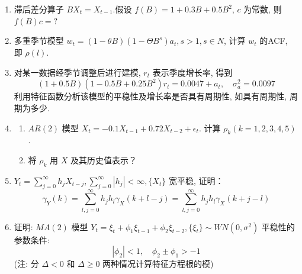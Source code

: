\begin{enumerate}
    
    \item 滞后差分算子 $B X_{t}=X_{t-1}$.假设 $f(B)=1+0.3B+0.5B^{2}$, $c$ 为常数, 则 $f(B)c=?$
    
    \item 多重季节模型 $w_{t}=(1-\theta B)(1-\Theta B^{s})a_{t}, s>1, s\in N$, 计算 $w_{t}$ 的ACF, 即 $\rho(l)$.
    
    \item 对某一数据经季节调整后进行建模, $r_{t}$ 表示季度增长率, 得到
    \[ (1+0.5B)(1-0.5B+0.25B^{2})r_{t}=0.0047+a_{t}, \quad \sigma_{a}^{2}=0.0097 \]
    利用特征函数分析该模型的平稳性及增长率是否具有周期性, 如具有周期性, 周期为多少.
    
    \item 
    \begin{enumerate}
        \item[(1)] $AR(2)$ 模型 $X_{t}=-0.1X_{t-1}+0.72X_{t-2}+\epsilon_{t}$. 计算 $\rho_{k}(k=1,2,3,4,5)$.
        \item[(2)] 将 $\rho_k$ 用 $X$ 及其历史值表示？
    \end{enumerate}
    
    \item $Y_{t}=\sum_{j=0}^{\infty}h_{j}X_{t-j}, \sum_{j=0}^{\infty}|h_{j}|<\infty, \{X_{t}\}$ 宽平稳, 证明：
    \[ \gamma_Y(k) = \sum_{l,j=0}^{\infty}h_{j}h_{l}\gamma_{X}(k+l-j) = \sum_{l,j=0}^{\infty}h_{j}h_{l}\gamma_{X}(k+j-l) \]
    
    \item 证明: $MA(2)$ 模型 $Y_{t}=\xi_{t}+\phi_{1}\xi_{t-1}+\phi_{2}\xi_{t-2}, \{\xi_{t}\}\sim WN(0,\sigma^{2})$ 平稳性的参数条件:
    \[ |\phi_{2}|<1, \quad \phi_{2}\pm\phi_{1}>-1 \]
    (注: 分 $\Delta<0$ 和 $\Delta\ge 0$ 两种情况计算特征方程根的模)

\end{enumerate}

